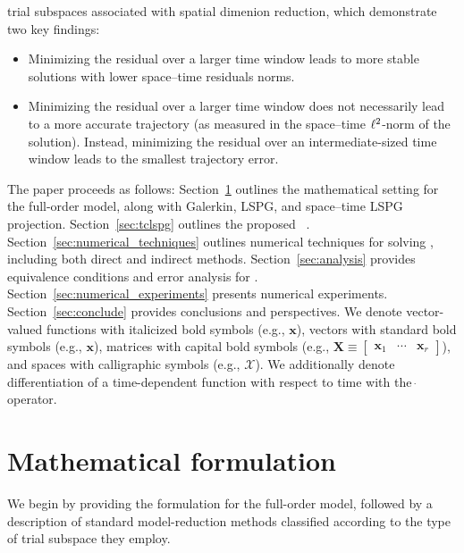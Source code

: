\documentclass[3p,computermodern,10pt]{elsarticle}
\begin{document}
\begin{enumerate}
	trial subspaces associated with spatial dimenion reduction, which demonstrate two key findings:
\begin{itemize}
\item Minimizing the residual over a larger time window leads to more stable solutions 
with lower space--time residuals norms.
\item Minimizing the residual over a larger time window does not necessarily
	lead to a more accurate trajectory (as measured in the space--time
		$\ell^2$-norm of the solution). Instead, minimizing the residual over an
		intermediate-sized time window leads to the smallest trajectory error.
\end{itemize}
\end{enumerate}

The paper proceeds as follows: Section~\ref{sec:math}
outlines the mathematical setting for the full-order model, along with Galerkin, LSPG, and
space--time LSPG projection. Section~\ref{sec:tclspg} outlines the proposed \methodAcronym\
\approachKwd. Section~\ref{sec:numerical_techniques}
outlines numerical techniques for solving \methodAcronymROMs, including both direct and
indirect methods. Section~\ref{sec:analysis} provides
equivalence conditions and error analysis for \methodAcronymROMs.
Section~\ref{sec:numerical_experiments} presents numerical experiments.
Section~\ref{sec:conclude} provides conclusions and perspectives.
We denote vector-valued functions with italicized bold symbols (e.g., $\boldsymbol
x$), vectors with standard bold symbols (e.g., $\mathbf{x}$), 
matrices with capital bold symbols (e.g., $\mathbf{X} \equiv \begin{bmatrix}
\mathbf{x}_1 & \cdots & \mathbf{x}_r\end{bmatrix}$), and spaces with
calligraphic symbols (e.g., $\mathcal{X}$). We additionally denote differentiation of a time-dependent 
function with respect to time with the $\dot\ $ operator.
\section{Mathematical formulation}\label{sec:math}
	We begin by providing the formulation for the full-order model,
	followed by a description of standard model-reduction methods
	classified according to the type of trial subspace they employ.
\end{document}
